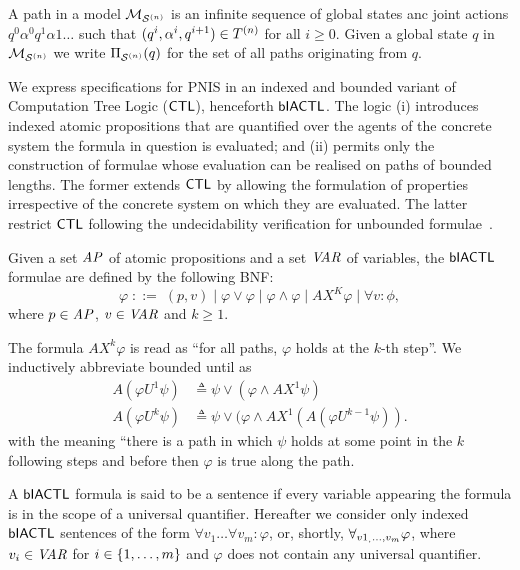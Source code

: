 A path in a model $\mathcal{M}_{\mathcal{S}^{(n)}}$ is an infinite sequence of global states anc joint
actions $q^0\alpha^0q^1\alpha1\ldots$ such that $(q^i,\alpha^i,q^{i+1}) \in
T^{(n)}$ for all $i \geq 0$. Given a global state $q$ in $\mathcal{M}_{\mathcal{S}^{(n)}}$ we write
$\Pi_{\mathcal{S}^{(n)}}(q)$ for the set of all paths originating from $q$.
  
We express specifications for PNIS in an indexed and bounded variant of
Computation Tree Logic ($\sf{CTL}$), henceforth $\sf{bIACTL}$. The logic (i) introduces
indexed atomic propositions that are quantified over the agents of the concrete
system the formula in question is evaluated; and (ii) permits only the
construction of formulae whose evaluation can be realised on paths of bounded
lengths. The former extends $\sf{CTL}$ by allowing the formulation of properties
irrespective of the concrete system on which they are evaluated.  The latter
restrict $\sf{CTL}$ following the undecidability verification for unbounded
formulae~\cite{Akintunde+20}.

\begin{definition}
Given a  set $\it{AP}$ of atomic propositions and a set $\it{VAR}$ of variables,
the $\sf{bIACTL}$  formulae are defined by the following BNF:
\[
  \varphi \;   ::= \; (p, v) \mid \varphi \lor \varphi \mid \varphi \land \varphi
  \mid AX^K \varphi \mid \forall v : \phi,
\]
where  $p \in \it{AP}$, $v \in \it{VAR}$ and $k \geq  1$.
\end{definition}

The formula $AX^k \varphi$ is read as ``for all paths, $\varphi$ holds at the
$k$-th step''. We inductively abbreviate bounded until as
\begin{align*}
 A(\varphi U^1 \psi) &\triangleq \psi \lor (\varphi \land AX^1 \psi) \\
 A(\varphi U^k \psi) &\triangleq \psi \lor (\varphi \land AX^1 (A (\varphi U^{k-1} \psi)).
\end{align*}
with the meaning ``there is a path in which $\psi$ holds at some point in the
$k$ following steps and before then $\varphi$ is true along the path. 

A $\sf{bIACTL}$ formula is said to be a sentence if every variable appearing the
formula is in the scope of a universal quantifier. Hereafter we consider only
indexed $\sf{bIACTL}$ sentences of the form $\forall v_1 \ldots \forall v_m :
\varphi$, or, shortly, $\forall_{v1_,\ldots,v_m} \varphi$, where $v_i \in \it{VAR}$ for $i \in
\left \{ 1,\ldots,m \right \}$ and $\varphi$ does not contain any universal quantifier.

